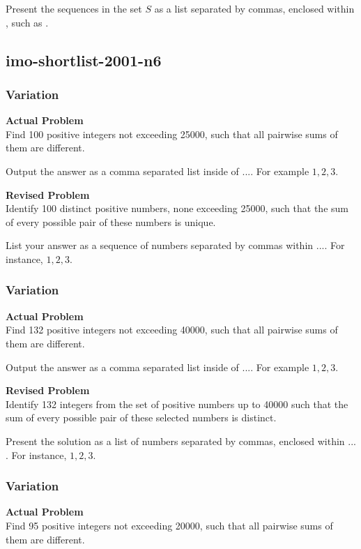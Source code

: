 Present the sequences in the set \( S \) as a list separated by commas, enclosed within \boxed{}, such as .

\subsection{imo-shortlist-2001-n6}
\subsubsection{Variation}
\textbf{Actual Problem}\\
Find 100 positive integers not exceeding 25000, such that all pairwise sums of them are different.

Output the answer as a comma separated list inside of $\boxed{...}$. For example $\boxed{1, 2, 3}$.

\textbf{Revised Problem}\\
Identify 100 distinct positive numbers, none exceeding 25000, such that the sum of every possible pair of these numbers is unique.

List your answer as a sequence of numbers separated by commas within $\boxed{...}$. For instance, $\boxed{1, 2, 3}$.

\subsubsection{Variation}
\textbf{Actual Problem}\\
Find 132 positive integers not exceeding 40000, such that all pairwise sums of them are different.

Output the answer as a comma separated list inside of $\boxed{...}$. For example $\boxed{1, 2, 3}$.

\textbf{Revised Problem}\\
Identify 132 integers from the set of positive numbers up to 40000 such that the sum of every possible pair of these selected numbers is distinct.

Present the solution as a list of numbers separated by commas, enclosed within $\boxed{...}$. For instance, $\boxed{1, 2, 3}$.

\subsubsection{Variation}
\textbf{Actual Problem}\\
Find 95 positive integers not exceeding 20000, such that all pairwise sums of them are different.

